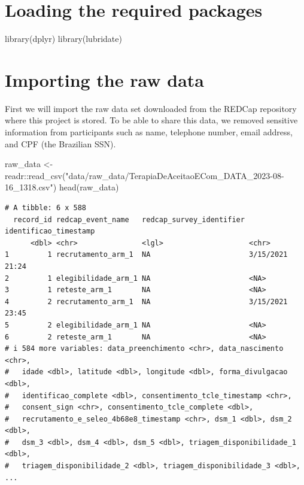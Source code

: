 \documentclass[
  letterpaper,
  DIV=11,
  numbers=noendperiod]{scrreprt}
\newenvironment{Shaded}{\begin{snugshade}}{\end{snugshade}}
\newcommand{\FunctionTok}[1]{\textcolor[rgb]{0.28,0.35,0.67}{#1}}
\newcommand{\NormalTok}[1]{\textcolor[rgb]{0.00,0.23,0.31}{#1}}
\newcommand{\OtherTok}[1]{\textcolor[rgb]{0.00,0.23,0.31}{#1}}
\newcommand{\SpecialCharTok}[1]{\textcolor[rgb]{0.37,0.37,0.37}{#1}}
\newcommand{\StringTok}[1]{\textcolor[rgb]{0.13,0.47,0.30}{#1}}
\begin{document}
\hypertarget{loading-the-required-packages}{%
\section{Loading the required
packages}\label{loading-the-required-packages}}

\begin{Shaded}
\begin{Highlighting}[]
\FunctionTok{library}\NormalTok{(dplyr)}
\FunctionTok{library}\NormalTok{(lubridate)}
\end{Highlighting}
\end{Shaded}

\hypertarget{importing-the-raw-data}{%
\section{Importing the raw data}\label{importing-the-raw-data}}

First we will import the raw data set downloaded from the REDCap
repository where this project is stored. To be able to share this data,
we removed sensitive information from participants such as name,
telephone number, email address, and CPF (the Brazilian SSN).

\begin{Shaded}
\begin{Highlighting}[]
\NormalTok{raw\_data }\OtherTok{\textless{}{-}}\NormalTok{ readr}\SpecialCharTok{::}\FunctionTok{read\_csv}\NormalTok{(}\StringTok{"data/raw\_data/TerapiaDeAceitaoECom\_DATA\_2023{-}08{-}16\_1318.csv"}\NormalTok{)}
\FunctionTok{head}\NormalTok{(raw\_data)}
\end{Highlighting}
\end{Shaded}

\begin{verbatim}
# A tibble: 6 x 588
  record_id redcap_event_name   redcap_survey_identifier identificao_timestamp
      <dbl> <chr>               <lgl>                    <chr>                
1         1 recrutamento_arm_1  NA                       3/15/2021 21:24      
2         1 elegibilidade_arm_1 NA                       <NA>                 
3         1 reteste_arm_1       NA                       <NA>                 
4         2 recrutamento_arm_1  NA                       3/15/2021 23:45      
5         2 elegibilidade_arm_1 NA                       <NA>                 
6         2 reteste_arm_1       NA                       <NA>                 
# i 584 more variables: data_preenchimento <chr>, data_nascimento <chr>,
#   idade <dbl>, latitude <dbl>, longitude <dbl>, forma_divulgacao <dbl>,
#   identificao_complete <dbl>, consentimento_tcle_timestamp <chr>,
#   consent_sign <chr>, consentimento_tcle_complete <dbl>,
#   recrutamento_e_seleo_4b68e8_timestamp <chr>, dsm_1 <dbl>, dsm_2 <dbl>,
#   dsm_3 <dbl>, dsm_4 <dbl>, dsm_5 <dbl>, triagem_disponibilidade_1 <dbl>,
#   triagem_disponibilidade_2 <dbl>, triagem_disponibilidade_3 <dbl>, ...
\end{verbatim}
\end{document}
